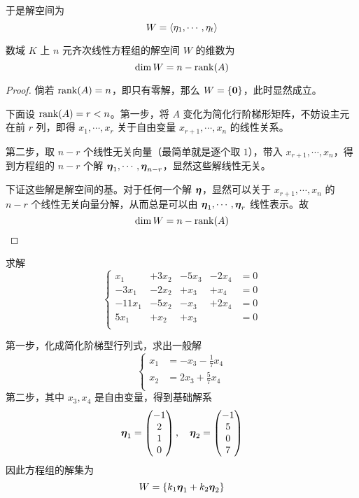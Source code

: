 于是解空间为
\[W = \langle \eta_1,\cdots,\eta_t \rangle\]

\begin{theorem}
	数域 $K$ 上 $n$ 元齐次线性方程组的解空间 $W$ 的维数为
	\[\dim W = n-\operatorname{rank}(A)\]
\end{theorem}

\begin{proof}
	倘若 $\operatorname{rank}(A) = n$，即只有零解，那么 $W = \{\boldsymbol{0}\}$，此时显然成立。

	下面设 $\operatorname{rank}(A) = r < n$。第一步，将 $A$ 变化为简化行阶梯形矩阵，不妨设主元在前 $r$ 列，即得 $x_1, \cdots, x_r$ 关于自由变量 $x_{r+1}, \cdots, x_n$ 的线性关系。

	第二步，取 $n-r$ 个线性无关向量（最简单就是逐个取 $1$），带入 $x_{r+1}, \cdots, x_n$，得到方程组的 $n-r$ 个解 $\boldsymbol{\eta}_1,\cdots,\boldsymbol{\eta}_{n-r}$，显然这些解线性无关。

	下证这些解是解空间的基。对于任何一个解 $\boldsymbol{\eta}$，显然可以关于 $x_{r+1}, \cdots, x_n$ 的 $n-r$ 个线性无关向量分解，从而总是可以由 $\boldsymbol{\eta}_1,\cdots,\boldsymbol{\eta}_r$ 线性表示。故
	\[ \dim W = n - \operatorname{rank}(A) \]
\end{proof}

\begin{example}
	求解
	\[ \left\{
		\begin{aligned}
			x_1    & + 3x_2 & - 5x_3 & - 2x_4 & = 0 \\
			-3x_1  & - 2x_2 & + x_3  & + x_4  & = 0 \\
			-11x_1 & - 5x_2 & - x_3  & + 2x_4 & = 0 \\
			5x_1   & + x_2  & +x_3   &        & = 0 \\
		\end{aligned} \right. \]
\end{example}

第一步，化成简化阶梯型行列式，求出一般解
\[ \left\{
	\begin{aligned}
		x_1 & = -x_3 - \frac{1}{7}x_4 \\
		x_2 & = 2x_3 + \frac{5}{7}x_4 \\
	\end{aligned} \right. \]
第二步，其中 $x_3, x_4$ 是自由变量，得到基础解系
\[ \boldsymbol{\eta}_1 = \left(\begin{matrix}
			-1 \\ 2 \\ 1 \\ 0
		\end{matrix}\right), \quad \boldsymbol{\eta}_2 = \left(\begin{matrix}
			-1 \\ 5 \\ 0 \\ 7
		\end{matrix}\right) \]
因此方程组的解集为
\[ W = \{ k_1 \boldsymbol{\eta}_1 + k_2 \boldsymbol{\eta}_2 \} \]

